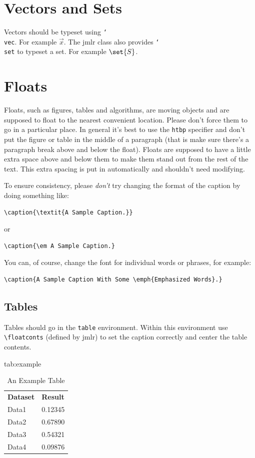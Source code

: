 \documentclass[pmlr]{jmlr}%
\newcommand{\cs}[1]{\texttt{\char`\\#1}}
\begin{document}
\section{Vectors and Sets}
\label{sec:vec}

Vectors should be typeset using \cs{vec}. For example $\vec{x}$.
The \textsf{jmlr} class also provides \cs{set} to typeset a
set. For example $\set{S}$.

\section{Floats}
\label{sec:floats}

Floats, such as figures, tables and algorithms, are moving
objects and are supposed to float to the nearest convenient
location. Please don't force them to go in a particular place. In
general it's best to use the \texttt{htbp} specifier and don't
put the figure or table in the middle of a paragraph (that is
make sure there's a paragraph break above and below the float).
Floats are supposed to have a little extra space above and below
them to make them stand out from the rest of the text. This extra
spacing is put in automatically and shouldn't need modifying.

To ensure consistency, please \emph{don't} try changing the format of the caption by doing
something like:
\begin{verbatim}
\caption{\textit{A Sample Caption.}}
\end{verbatim}
or
\begin{verbatim}
\caption{\em A Sample Caption.}
\end{verbatim}
You can, of course, change the font for individual words or 
phrases, for example:
\begin{verbatim}
\caption{A Sample Caption With Some \emph{Emphasized Words}.}
\end{verbatim}

\subsection{Tables}
\label{sec:tables}

Tables should go in the \texttt{table} environment. Within this
environment use \verb|\floatconts| (defined by \textsf{jmlr})
to set the caption correctly and center the table contents.

\begin{table}[htbp]
\floatconts
  {tab:example}%
  {\caption{An Example Table}}%
  {\begin{tabular}{ll}
  \bfseries Dataset & \bfseries Result\\
  Data1 & 0.12345\\
  Data2 & 0.67890\\
  Data3 & 0.54321\\
  Data4 & 0.09876
  \end{tabular}}
\end{table}
\end{document}
